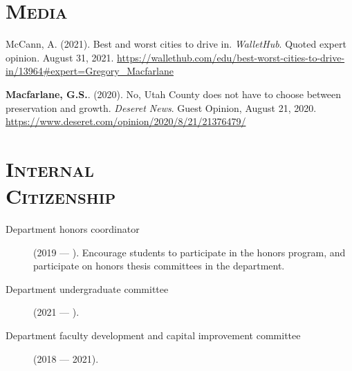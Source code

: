 \documentclass[margin,line]{res}
\newcommand{\secfont}{\scshape }
\begin{document}
\begin{resume}
\section{\secfont Media}

McCann, A. (2021). Best and worst cities to drive in. \textit{WalletHub}. Quoted expert opinion. August 31, 2021. \url{https://wallethub.com/edu/best-worst-cities-to-drive-in/13964#expert=Gregory_Macfarlane}

\textbf{Macfarlane, G.S.}. (2020). No, Utah County does not have to choose between preservation and growth. \textit{Deseret News}. Guest Opinion, August 21, 2020. \url{https://www.deseret.com/opinion/2020/8/21/21376479/}

\noindent\makebox[\linewidth]{\rule{\linewidth}{0.4pt}}
\section{\secfont Internal \\ Citizenship}
\begin{description}
  \item[Department honors coordinator] (2019 --- ). Encourage students to participate
  in the honors program, and participate on honors thesis committees in the
  department.
  \item[Department undergraduate committee] (2021 --- ).
  \item[Department faculty development and capital improvement committee] (2018 --- 2021).
\end{description}






\end{resume}
\end{document}
